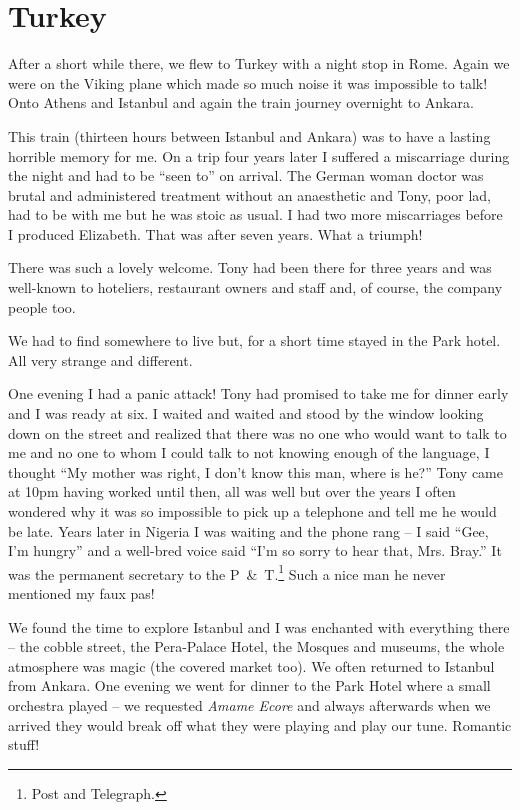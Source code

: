 \chapter{Turkey}

After a short while there, we flew to Turkey with a night stop in
Rome. Again we were on the Viking plane which made so much noise it
was impossible to talk! Onto Athens and Istanbul and again the train
journey overnight to Ankara.

This train (thirteen hours between Istanbul and Ankara) was to have a
lasting horrible memory for me. On a trip four years later I suffered
a miscarriage during the night and had to be ``seen to'' on
arrival. The German woman doctor was brutal and administered treatment
without an anaesthetic and Tony, poor lad, had to be with me but he
was stoic as usual. I had two more miscarriages before I produced
Elizabeth. That was after seven years. What a triumph!

There was such a lovely welcome. Tony had been there for three years
and was well-known to hoteliers, restaurant owners and staff and, of
course, the company people too.

We had to find somewhere to live but, for a short time stayed in the
Park hotel. All very strange and different.

One evening I had a panic attack! Tony had promised to take me for
dinner early and I was ready at six. I waited and waited and stood by
the window looking down on the street and realized that there was no
one who would want to talk to me and no one to whom I could talk to
not knowing enough of the language, I thought ``My mother was right, I
don't know this man, where is he?'' Tony came at 10pm having worked
until then, all was well but over the years I often wondered why it
was so impossible to pick up a telephone and tell me he would be
late. Years later in Nigeria I was waiting and the phone rang -- I
said ``Gee, I'm hungry'' and a well-bred voice said ``I'm so sorry to
hear that, Mrs. Bray.'' It was the permanent secretary to the
P~\&~T.\footnote{Post and Telegraph.} Such a nice man he never
mentioned my faux pas!

We found the time to explore Istanbul and I was enchanted with
everything there -- the cobble street, the Pera-Palace Hotel, the
Mosques and museums, the whole atmosphere was magic (the covered
market too). We often returned to Istanbul from Ankara. One evening we
went for dinner to the Park Hotel where a small orchestra played -- we
requested \textit{Amame Ecore} and always afterwards when we arrived
they would break off what they were playing and play our
tune. Romantic stuff!

